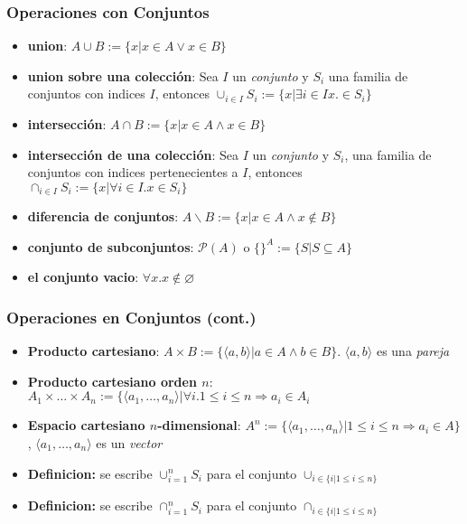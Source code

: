 \documentclass{beamer}
\begin{document}
\begin{frame}
    \frametitle{Operaciones con Conjuntos}
    \begin{itemize}
        \item{{\bf union}: $A\cup B:=\{x|x\in A\vee x\in B\}$}
        \item{{\bf union sobre una colecci\'on}: Sea $I$ un
        \emph{conjunto} y $S_i$ una familia de conjuntos
        con indices $I$, entonces $\cup_{i\in I}S_i := \{
        x|\exists i\in I x.\in S_i \}$}
        \item{{\bf intersecci\'on}: $A\cap B := \{x|x\in A\wedge x\in B \}$}
        \item{{\bf intersecci\'on de una colecci\'on}: Sea $I$ un
        \emph{conjunto} y $S_i$, una familia de conjuntos con
        indices pertenecientes a $I$, entonces $\cap_{i\in I}S_i:=
        \{x|\forall i\in I.x\in S_i\}$}
        \item{{\bf diferencia de conjuntos}: $A\backslash B:=\{x
        |x\in A\wedge x\not\in B\}$}
        \item{{\bf conjunto de subconjuntos}: $\mathcal{P}(A)$ o
        $\{\}^{A}:=\{S|S\subseteq A\}$}
        \item{{\bf el conjunto vacio}: $\forall x.x\not\in \varnothing$}
    \end{itemize}
\end{frame}

\begin{frame}
\frametitle{Operaciones en Conjuntos (cont.)}
\begin{itemize}
    \item{{\bf Producto cartesiano}: $A\times B:=\{\langle a,b\rangle |
    a\in A \wedge b\in B\}$. $\langle a,b \rangle$ es una \emph{pareja}}
    \item{{\bf Producto cartesiano orden $n$}: $A_1\times\ldots\times A_n := \{
        \langle a_1,\ldots,a_n\rangle | \forall i.1\leq i \leq n \Rightarrow
        a_i\in A_i$}
    \item{{\bf Espacio cartesiano $n$-dimensional}: $A^n := \{
        \langle a_1,\ldots,a_n \rangle | 1\leq i\leq n \Rightarrow
        a_i\in A \}$, $\langle a_1,\ldots,a_n\rangle$ es un \emph{vector}}
        \item{{\bf Definicion:} se escribe $\cup_{i=1}^{n}S_i$ para
        el conjunto $\cup_{i\in\{i | 1\leq i \leq n \}}$}
        \item{{\bf Definicion:} se escribe $\cap_{i=1}^{n}S_i$ para
        el conjunto $\cap_{i\in\{i | 1\leq i \leq n \}}$}
\end{itemize}
\end{frame}
\end{document}

